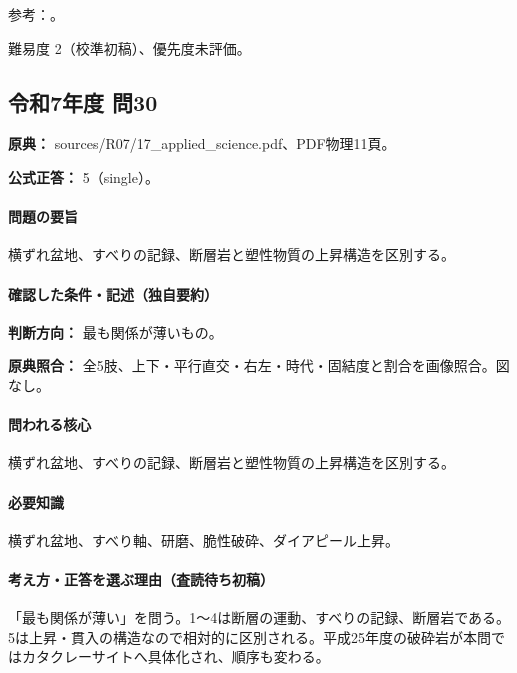 \par 参考：\cite{str_source}。

\par 難易度 2（校準初稿）、優先度未評価。

\subsection{令和7年度 問30}
\label{q:r07-reg-applied-30}

\noindent\textbf{原典：} sources/R07/17\_applied\_science.pdf、PDF物理11頁。

\textbf{公式正答：} 5（single）。

\paragraph{問題の要旨} 横ずれ盆地、すべりの記録、断層岩と塑性物質の上昇構造を区別する。

\paragraph{確認した条件・記述（独自要約）}\mbox{}\par

\noindent\textbf{判断方向：} 最も関係が薄いもの。\par

\noindent\textbf{原典照合：} 全5肢、上下・平行直交・右左・時代・固結度と割合を画像照合。図なし。\par

\paragraph{問われる核心} 横ずれ盆地、すべりの記録、断層岩と塑性物質の上昇構造を区別する。

\paragraph{必要知識} 横ずれ盆地、すべり軸、研磨、脆性破砕、ダイアピール上昇。

\paragraph{考え方・正答を選ぶ理由（査読待ち初稿）} 「最も関係が薄い」を問う。1〜4は断層の運動、すべりの記録、断層岩である。5は上昇・貫入の構造なので相対的に区別される。平成25年度の破砕岩が本問ではカタクレーサイトへ具体化され、順序も変わる。

